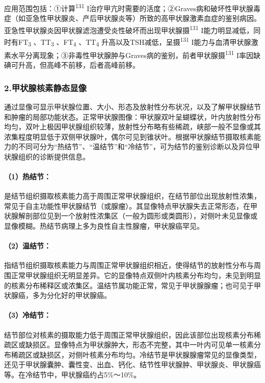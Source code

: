 应用范围包括：①计算\textsuperscript{131}
I治疗甲亢时需要的活度；②Graves病和破坏性甲状腺毒症（如亚急性甲状腺炎、产后甲状腺炎等）所致的高甲状腺激素血症的鉴别病因。亚急性甲状腺炎因甲状腺滤泡遭受炎性破坏而出现甲状腺摄\textsuperscript{131}
I能力明显减低，同时有FT\textsubscript{3} 、TT\textsubscript{3}
、FT\textsubscript{4} 、TT\textsubscript{4}
升高以及TSH减低，呈摄\textsuperscript{131}
I能力与血清甲状腺激素水平分离现象；③非毒性甲状腺肿与Graves病的鉴别，前者甲状腺摄\textsuperscript{131}
I率因缺碘可升高，但高峰不前移，后者高峰前移。

\subsubsection{2.甲状腺核素静态显像}

通过显像可显示甲状腺位置、大小、形态及放射性分布状况，以及了解甲状腺结节和肿瘤的局部功能状态。正常甲状腺图像：甲状腺双叶呈蝴蝶状，叶内放射性分布均匀，双叶上极因甲状腺组织较薄，放射性分布略有些稀疏，峡部一般不显像或其浓集程度明显低于双侧甲状腺叶，偶尔可见到锥状叶。根据甲状腺结节摄取核素能力的不同可分为“热结节”、“温结节”和“冷结节”，可为结节的鉴别诊断以及异位甲状腺组织的诊断提供信息。

\paragraph{（1）热结节：}

是结节组织摄取核素能力高于周围正常甲状腺组织，在结节部位出现放射性浓集，常见于自主功能性甲状腺结节（或腺瘤）。其显像特点甲状腺失去正常形态，在甲状腺解剖部位见到一个放射性浓集区（一般为圆形或类圆形），对侧叶未见显像或显像模糊。热结节病理上多为良性自主性腺瘤，甲状腺癌罕见。

\paragraph{（2）温结节：}

指结节组织摄取核素能力与周围正常甲状腺组织相近，使得结节的放射性分布与周围正常甲状腺组织无明显差异。它的显像特点双侧叶内核素分布均匀，未见到明显的核素分布稀释区或浓集区。温结节属功能正常，常见于甲状腺腺瘤；也可见于甲状腺癌，多为分化好的甲状腺癌。

\paragraph{（3）冷结节：}

结节部位对核素的摄取能力低于周围正常甲状腺组织，因此该部位出现核素分布稀疏区或缺损区。显像特点为甲状腺肿大，形态不完整，其中一叶内可见单一核素分布稀疏区或缺损区，对侧叶核素分布均匀。冷结节是甲状腺腺瘤常见的显像类型，还见于甲状腺囊肿、囊性变、出血、钙化、结节性甲状腺肿、甲状腺炎、甲状腺癌等。在冷结节中，甲状腺癌约占5\%～10\%。

